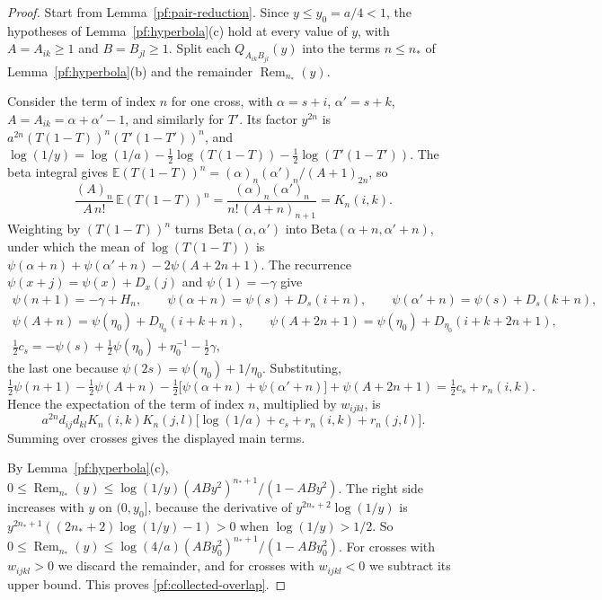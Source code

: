 \documentclass[11pt]{amsart}
\numberwithin{equation}{section}
\theoremstyle{definition}
\theoremstyle{remark}
\begin{document}
\begin{proof}
Start from Lemma~\ref{pf:pair-reduction}. Since $y\le y_0=a/4<1$, the
hypotheses of Lemma~\ref{pf:hyperbola}(c) hold at every value of $y$,
with $A=A_{ik}\ge1$ and $B=B_{jl}\ge1$. Split each
$Q_{A_{ik}B_{jl}}(y)$ into the terms $n\le n_*$ of
Lemma~\ref{pf:hyperbola}(b) and the remainder $\operatorname{Rem}_{n_*}(y)$.

Consider the term of index $n$ for one cross, with $\alpha=s+i$,
$\alpha'=s+k$, $A=A_{ik}=\alpha+\alpha'-1$, and similarly for $T'$. Its
factor $y^{2n}$ is $a^{2n}(T(1-T))^n(T'(1-T'))^n$, and
$\log(1/y)=\log(1/a)-\frac12\log(T(1-T))-\frac12\log(T'(1-T'))$. The
beta integral gives $\mathbb E(T(1-T))^n=(\alpha)_n(\alpha')_n/(A+1)_{2n}$,
so
\[
 \frac{(A)_n}{A\,n!}\,\mathbb E(T(1-T))^n
 =\frac{(\alpha)_n(\alpha')_n}{n!\,(A+n)_{n+1}}=K_n(i,k).
\]
Weighting by $(T(1-T))^n$ turns $\mathrm{Beta}(\alpha,\alpha')$ into
$\mathrm{Beta}(\alpha+n,\alpha'+n)$, under which the mean of
$\log(T(1-T))$ is $\psi(\alpha+n)+\psi(\alpha'+n)-2\psi(A+2n+1)$. The
recurrence $\psi(x+j)=\psi(x)+D_x(j)$ and $\psi(1)=-\gamma$ give
\[
 \begin{gathered}
 \psi(n+1)=-\gamma+H_n,\qquad
 \psi(\alpha+n)=\psi(s)+D_s(i+n),\qquad
 \psi(\alpha'+n)=\psi(s)+D_s(k+n),\\
 \psi(A+n)=\psi(\eta_0)+D_{\eta_0}(i+k+n),\qquad
 \psi(A+2n+1)=\psi(\eta_0)+D_{\eta_0}(i+k+2n+1),\\
 \tfrac12c_s=-\psi(s)+\tfrac12\psi(\eta_0)+\eta_0^{-1}-\tfrac12\gamma,
 \end{gathered}
\]
the last one because $\psi(2s)=\psi(\eta_0)+1/\eta_0$. Substituting,
\[
 \tfrac12\psi(n+1)-\tfrac12\psi(A+n)
 -\tfrac12\bigl[\psi(\alpha+n)+\psi(\alpha'+n)\bigr]+\psi(A+2n+1)
 =\tfrac12c_s+r_n(i,k).
\]
Hence the expectation of the term of index $n$, multiplied by
$w_{ijkl}$, is
\[
 a^{2n}d_{ij}d_{kl}K_n(i,k)K_n(j,l)\bigl[\log(1/a)+c_s+r_n(i,k)
 +r_n(j,l)\bigr].
\]
Summing over crosses gives the displayed main terms.

By Lemma~\ref{pf:hyperbola}(c),
$0\le\operatorname{Rem}_{n_*}(y)\le\log(1/y)(ABy^2)^{n_*+1}/(1-ABy^2)$. The right
side increases with $y$ on $(0,y_0]$, because the derivative of
$y^{2n_*+2}\log(1/y)$ is $y^{2n_*+1}((2n_*+2)\log(1/y)-1)>0$ when
$\log(1/y)>1/2$. So
$0\le\operatorname{Rem}_{n_*}(y)\le\log(4/a)(ABy_0^2)^{n_*+1}/(1-ABy_0^2)$. For
crosses with $w_{ijkl}>0$ we discard the remainder, and for crosses
with $w_{ijkl}<0$ we subtract its upper bound. This proves
\eqref{pf:collected-overlap}.
\end{proof}
\end{document}
